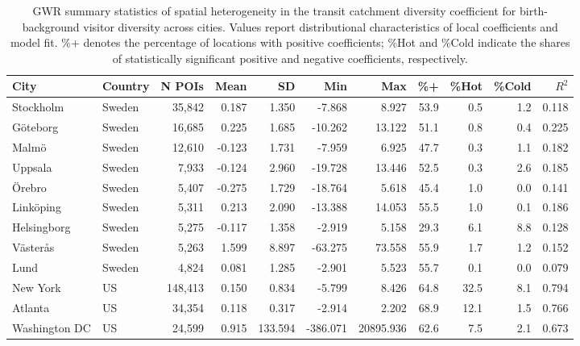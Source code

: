 \begin{table}[htbp]
  \centering
  \caption{GWR summary statistics of spatial heterogeneity in the transit catchment diversity coefficient for birth-background visitor diversity across cities. Values report distributional characteristics of local coefficients and model fit. \%+ denotes the percentage of locations with positive coefficients; \%Hot and \%Cold indicate the shares of statistically significant positive and negative coefficients, respectively.}
  \label{tab:gwr_summary}
  \small
  \begin{tabular}{llrrrrrrrrr}
  \toprule
  \textbf{City} & \textbf{Country} & \textbf{N POIs} & \textbf{Mean} & \textbf{SD} & \textbf{Min} & \textbf{Max} & \textbf{\%+} & \textbf{\%Hot} & \textbf{\%Cold} & \textbf{$R^2$} \\
  \midrule
  Stockholm     & Sweden & 35,842  &  0.187 &   1.350 &   -7.868 &     8.927 & 53.9 &  0.5 & 1.2 & 0.118 \\
  Göteborg      & Sweden & 16,685  &  0.225 &   1.685 &  -10.262 &    13.122 & 51.1 &  0.8 & 0.4 & 0.225 \\
  Malmö         & Sweden & 12,610  & -0.123 &   1.731 &   -7.959 &     6.925 & 47.7 &  0.3 & 1.1 & 0.182 \\
  Uppsala       & Sweden &  7,933  & -0.124 &   2.960 &  -19.728 &    13.446 & 52.5 &  0.3 & 2.6 & 0.185 \\
  Örebro        & Sweden &  5,407  & -0.275 &   1.729 &  -18.764 &     5.618 & 45.4 &  1.0 & 0.0 & 0.141 \\
  Linköping     & Sweden &  5,311  &  0.213 &   2.090 &  -13.388 &    14.053 & 55.5 &  1.0 & 0.1 & 0.186 \\
  Helsingborg   & Sweden &  5,275  & -0.117 &   1.358 &   -2.919 &     5.158 & 29.3 &  6.1 & 8.8 & 0.128 \\
  Västerås      & Sweden &  5,263  &  1.599 &   8.897 &  -63.275 &    73.558 & 55.9 &  1.7 & 1.2 & 0.152 \\
  Lund          & Sweden &  4,824  &  0.081 &   1.285 &   -2.901 &     5.523 & 55.7 &  0.1 & 0.0 & 0.079 \\
  New York      & US     & 148,413 &  0.150 &   0.834 &   -5.799 &     8.426 & 64.8 & 32.5 & 8.1 & 0.794 \\
  Atlanta       & US     &  34,354 &  0.118 &   0.317 &   -2.914 &     2.202 & 68.9 & 12.1 & 1.5 & 0.766 \\
  Washington DC & US     &  24,599 &  0.915 & 133.594 & -386.071 & 20895.936 & 62.6 &  7.5 & 2.1 & 0.673 \\
  \bottomrule
  \end{tabular}
\end{table}
